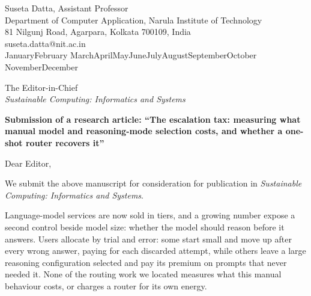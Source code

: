\documentclass[11pt]{article}
\renewcommand{\today}{\number\day\space\ifcase\month\or January\or February\or
  March\or April\or May\or June\or July\or August\or September\or October\or
  November\or December\fi\space\number\year}
\begin{document}
\begin{flushright}
Suseta Datta, Assistant Professor\\
Department of Computer Application, Narula Institute of Technology\\
81 Nilgunj Road, Agarpara, Kolkata 700109, India\\
suseta.datta@nit.ac.in\\[0.4em]
\today
\end{flushright}

The Editor-in-Chief\\
\emph{Sustainable Computing: Informatics and Systems}

{\raggedright\textbf{Submission of a research article: ``The escalation tax:
measuring what manual model and reasoning-mode selection costs, and whether a
one-shot router recovers it''}\par}

Dear Editor,

We submit the above manuscript for consideration for publication in
\emph{Sustainable Computing: Informatics and Systems}.

Language-model services are now sold in tiers, and a growing number expose a
second control beside model size: whether the model should reason before it
answers. Users allocate by trial and error: some start small and move up after
every wrong answer, paying for each discarded attempt, while others leave a
large reasoning configuration selected and pay its premium on prompts that
never needed it. None of the routing work we located measures what this manual
behaviour costs, or charges a router for its own energy.
\end{document}
